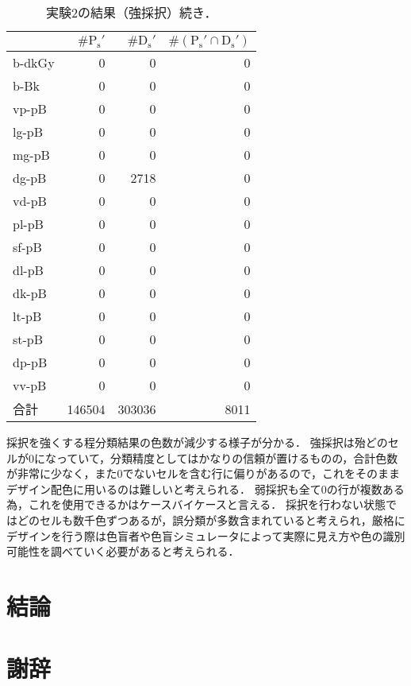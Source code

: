 \documentclass[uplatex,paper=a4,fontsize=4.0truemm,jafontsize=4.0truemm,head_space=30.0truemm,foot_space=30.0truemm,baselineskip=8.0truemm,line_length=40zw,gutter=25.0truemm,oneside,openany,fleqn,hanging_panctuation,open_bracket_pos=nibu_tentsuki,dvipdfmx,jis2004,book,titlepage]{jlreq}
\theoremstyle{mystyle}
\newcommand{\zwspace}{\hspace{1zw}\relax}
\newcommand{\captiondot}[1]{\caption{#1．}}
\newcommand{\tableinput}[4]{\begin{table}[tbp]\centering\captiondot{#3}\label{tab:#4}\begin{tabular}{#1}#2\end{tabular}\end{table}}
\newcommand{\parentheses}[1]{\left(#1\right)}
\begin{document}
				\tableinput{l|rrr}{ & \(\#\textrm{P}_\textrm{s}'\) & \(\#\textrm{D}_\textrm{s}'\) & \(\#\parentheses{\textrm{P}_\textrm{s}'\cap\textrm{D}_\textrm{s}'}\) \\ \hline
					b-dkGy & 0 & 0 & 0 \\
					b-Bk & 0 & 0 & 0 \\
					vp-pB & 0 & 0 & 0 \\
					lg-pB & 0 & 0 & 0 \\
					mg-pB & 0 & 0 & 0 \\
					dg-pB & 0 & 2718 & 0 \\
					vd-pB & 0 & 0 & 0 \\
					pl-pB & 0 & 0 & 0 \\
					sf-pB & 0 & 0 & 0 \\
					dl-pB & 0 & 0 & 0 \\
					dk-pB & 0 & 0 & 0 \\
					lt-pB & 0 & 0 & 0 \\
					st-pB & 0 & 0 & 0 \\
					dp-pB & 0 & 0 & 0 \\
					vv-pB & 0 & 0 & 0 \\ \hline
					合計 & 146504 & 303036 & 8011}{実験2の結果（強採択）\zwspace 続き}{result26}
				\clearpage

				採択を強くする程分類結果の色数が減少する様子が分かる．
				強採択は殆どのセルが0になっていて，分類精度としてはかなりの信頼が置けるものの，合計色数が非常に少なく，また0でないセルを含む行に偏りがあるので，これをそのままデザイン配色に用いるのは難しいと考えられる．
				弱採択も全て0の行が複数ある為，これを使用できるかはケースバイケースと言える．
				採択を行わない状態ではどのセルも数千色ずつあるが，誤分類が多数含まれていると考えられ，厳格にデザインを行う際は色盲者や色盲シミュレータによって実際に見え方や色の識別可能性を調べていく必要があると考えられる．
	\chapter{結論}
	\chapter*{謝辞}
%	
%
%
	\clearpage
	
	
\end{document}
